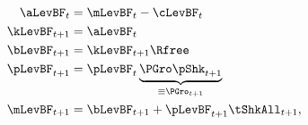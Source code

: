   \begin{equation}\label{eq:DBCparts}
   \begin{split}
     \aLevBF_{t}     & = \mLevBF_{t}-\cLevBF_{t}
\\     \kLevBF_{t+1}   & = \aLevBF_{t} \notag
\\      \bLevBF_{t+1}    & = \kLevBF_{t+1} \Rfree \notag \\
      \pLevBF_{t+1}  & = \pLevBF_{t} \underbrace{\PGro\pShk_{t+1}}_{\equiv \PGro_{t+1}} \notag \\
      \mLevBF_{t+1}  & =  \bLevBF_{t+1} +\pLevBF_{t+1}\tShkAll_{t+1},\notag
   \end{split}
  \end{equation}
